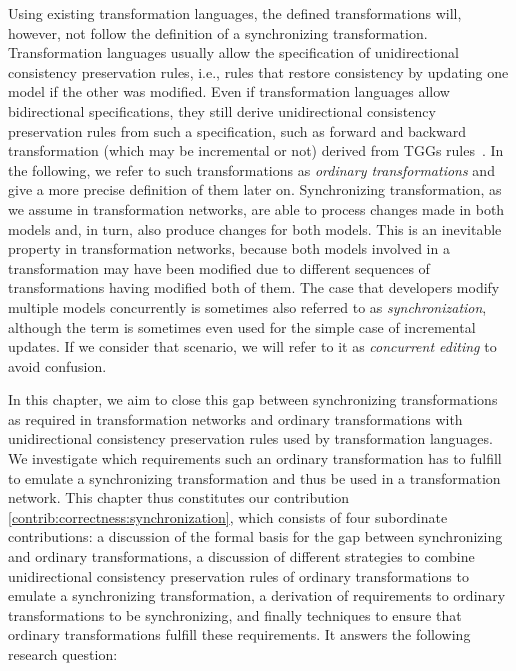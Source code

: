 Using existing transformation languages, the defined transformations will, however, not follow the definition of a synchronizing transformation.
Transformation languages usually allow the specification of unidirectional consistency preservation rules, i.e., rules that restore consistency by updating one model if the other was modified.
Even if transformation languages allow bidirectional specifications, they still derive unidirectional consistency preservation rules from such a specification, such as forward and backward transformation (which may be incremental or not) derived from \glspl{TGG} rules~\cite{leblebici2014IncrementalTGGSurvey-GTVMT}.
In the following, we refer to such transformations as \emph{ordinary transformations} and give a more precise definition of them later on.
Synchronizing transformation, as we assume in transformation networks, are able to process changes made in both models and, in turn, also produce changes for both models.
This is an inevitable property in transformation networks, because both models involved in a transformation may have been modified due to different sequences of transformations having modified both of them.
The case that developers modify multiple models concurrently is sometimes also referred to as \emph{synchronization}, although the term is sometimes even used for the simple case of incremental updates.
If we consider that scenario, we will refer to it as \emph{concurrent editing} to avoid confusion.

In this chapter, we aim to close this gap between synchronizing transformations as required in transformation networks and ordinary transformations with unidirectional consistency preservation rules used by transformation languages.
We investigate which requirements such an ordinary transformation has to fulfill to emulate a synchronizing transformation and thus be used in a transformation network.
This chapter thus constitutes our contribution \autoref{contrib:correctness:synchronization}, which consists of four subordinate contributions: a discussion of the formal basis for the gap between synchronizing and ordinary transformations, a discussion of different strategies to combine unidirectional consistency preservation rules of ordinary transformations to emulate a synchronizing transformation, a derivation of requirements to ordinary transformations to be synchronizing, and finally techniques to ensure that ordinary transformations fulfill these requirements.
It answers the following research question:

